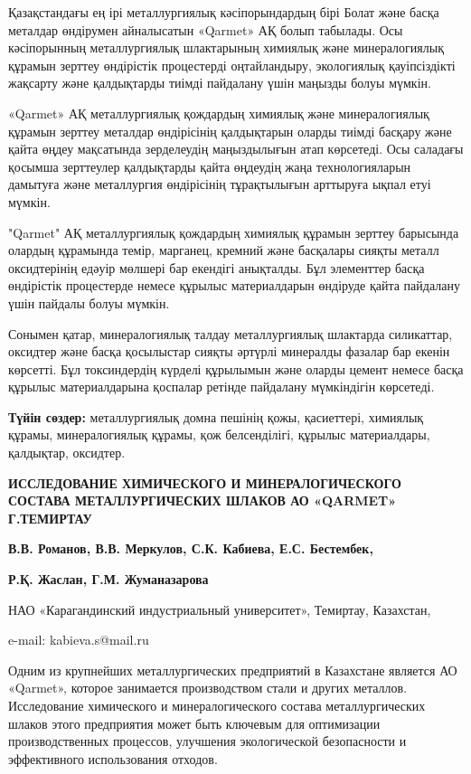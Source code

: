 Қазақстандағы ең ірі металлургиялық кәсіпорындардың бірі Болат және
басқа металдар өндірумен айналысатын «Qarmet» АҚ болып табылады. Осы
кәсіпорынның металлургиялық шлактарының химиялық және минералогиялық
құрамын зерттеу өндірістік процестерді оңтайландыру, экологиялық
қауіпсіздікті жақсарту және қалдықтарды тиімді пайдалану үшін маңызды
болуы мүмкін.

«Qarmet» АҚ металлургиялық қождардың химиялық және минералогиялық
құрамын зерттеу металдар өндірісінің қалдықтарын оларды тиімді басқару
және қайта өңдеу мақсатында зерделеудің маңыздылығын атап көрсетеді. Осы
саладағы қосымша зерттеулер қалдықтарды қайта өңдеудің жаңа
технологияларын дамытуға және металлургия өндірісінің тұрақтылығын
арттыруға ықпал етуі мүмкін.

"Qarmet" АҚ металлургиялық қождардың химиялық құрамын зерттеу барысында
олардың құрамында темір, марганец, кремний және басқалары сияқты металл
оксидтерінің едәуір мөлшері бар екендігі анықталды. Бұл элементтер басқа
өндірістік процестерде немесе құрылыс материалдарын өндіруде қайта
пайдалану үшін пайдалы болуы мүмкін.

Сонымен қатар, минералогиялық талдау металлургиялық шлактарда
силикаттар, оксидтер және басқа қосылыстар сияқты әртүрлі минералды
фазалар бар екенін көрсетті. Бұл токсиндердің күрделі құрылымын және
оларды цемент немесе басқа құрылыс материалдарына қоспалар ретінде
пайдалану мүмкіндігін көрсетеді.

{\bfseries Түйін сөздер:} металлургиялық домна пешінің қожы, қасиеттері,
химиялық құрамы, минералогиялық құрамы, қож белсенділігі, құрылыс
материалдары, қалдықтар, оксидтер.

\begin{center}
{\large\bfseries ИССЛЕДОВАНИЕ ХИМИЧЕСКОГО И МИНЕРАЛОГИЧЕСКОГО СОСТАВА
МЕТАЛЛУРГИЧЕСКИХ ШЛАКОВ АО «QARMET» Г.ТЕМИРТАУ}

{\bfseries В.В. Романов, В.В. Меркулов, С.К. Кабиева, Е.С. Бестембек,}

{\bfseries Р.Қ. Жаслан, Г.М. Жуманазарова}

НАО «Карагандинский индустриальный университет», Темиртау, Казахстан,

e-mail: kabieva.s@mail.ru
\end{center}

Одним из крупнейших металлургических предприятий в Казахстане является
АО «Qarmet», которое занимается производством стали и других металлов.
Исследование химического и минералогического состава металлургических
шлаков этого предприятия может быть ключевым для оптимизации
производственных процессов, улучшения экологической безопасности и
эффективного использования отходов.

